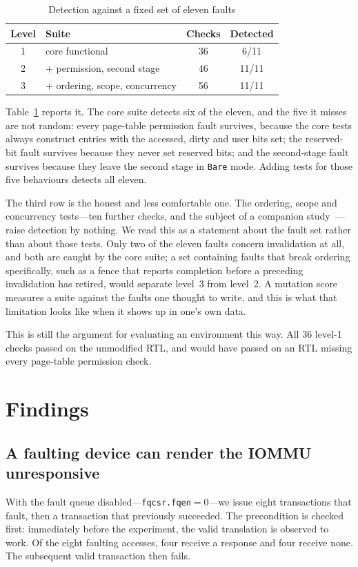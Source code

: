 \documentclass[journal]{IEEEtran}
\begin{document}
\begin{table}[!t]
\caption{Detection against a fixed set of eleven faults}
\label{tab:ablation}
\centering\footnotesize
\begin{tabular}{@{}clcc@{}}
\toprule
Level & Suite & Checks & Detected \\
\midrule
1 & core functional                        & 36 & 6/11 \\
2 & \quad + permission, second stage       & 46 & 11/11 \\
3 & \quad + ordering, scope, concurrency   & 56 & 11/11 \\
\bottomrule
\end{tabular}
\end{table}

Table~\ref{tab:ablation} reports it. The core suite detects six of the eleven,
and the five it misses are not random: every page-table permission fault
survives, because the core tests always construct entries with the accessed,
dirty and user bits set; the reserved-bit fault survives because they never set
reserved bits; and the second-stage fault survives because they leave the second
stage in \texttt{Bare} mode. Adding tests for those five behaviours detects all
eleven.

The third row is the honest and less comfortable one. The ordering, scope and
concurrency tests---ten further checks, and the subject of a companion
study~\cite{companionB}---raise detection by nothing. We read this as a
statement about the fault set rather than about those tests. Only two of the
eleven faults concern invalidation at all, and both are caught by the core
suite; a set containing faults that break ordering specifically, such as a fence
that reports completion before a preceding invalidation has retired, would
separate level~3 from level~2. A mutation score measures a suite against the
faults one thought to write, and this is what that limitation looks like when it
shows up in one's own data.

This is still the argument for evaluating an environment this way. All 36
level-1 checks passed on the unmodified RTL, and would have passed on an RTL
missing every page-table permission check.

\section{Findings}

\subsection{A faulting device can render the IOMMU unresponsive}
With the fault queue disabled---\texttt{fqcsr.fqen}$=$0---we issue eight
transactions that fault, then a transaction that previously succeeded. The
precondition is checked first: immediately before the experiment, the valid
translation is observed to work. Of the eight faulting accesses, four receive a
response and four receive none. The subsequent valid transaction then fails.
\end{document}
